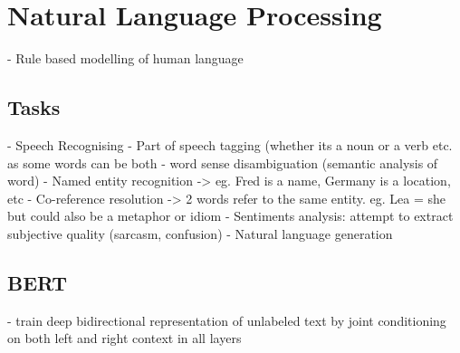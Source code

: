 \documentclass{report}
\begin{document}
\chapter{Natural Language Processing}
- Rule based modelling of human language
\section{Tasks}
- Speech Recognising
- Part of speech tagging (whether its a noun or a verb etc. as some words can be both
- word sense disambiguation (semantic analysis of word)
- Named entity recognition -> eg. Fred is a name, Germany is a location, etc
- Co-reference resolution -> 2 words refer to the same entity. eg. Lea = she but could also be a metaphor or idiom
- Sentiments analysis: attempt to extract subjective quality (sarcasm, confusion)
- Natural language generation

\section{BERT}
- train deep bidirectional representation of unlabeled text by joint conditioning on both left and right context in all layers
\end{document}
